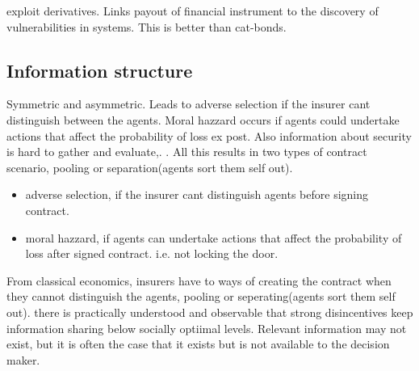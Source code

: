 exploit derivatives. Links payout of financial instrument to the discovery of vulnerabilities in systems. This is better than cat-bonds. 
\subsection{Information structure}
Symmetric and asymmetric. Leads to adverse selection if the insurer cant distinguish
 between the agents. Moral hazzard occurs if agents could undertake actions that affect
  the probability of loss ex post. Also information about security is hard to gather and
   evaluate,. . All this results in two types of contract scenario, pooling or
    separation(agents sort them self out).
    \begin{itemize}
    \item adverse selection, if the insurer cant distinguish agents before signing contract.
    \item moral hazzard, if agents can undertake actions that affect the probability of loss after signed contract. i.e. not locking the door.
    \end{itemize}
    From classical economics, insurers have to ways of creating the contract when they cannot distinguish the agents, pooling or seperating(agents sort them self out).
    there is practically understood and observable that strong disincentives keep information sharing below socially optiimal levels. Relevant information may not exist, 
    but it is often the case that it exists but is not available to the decision maker.

